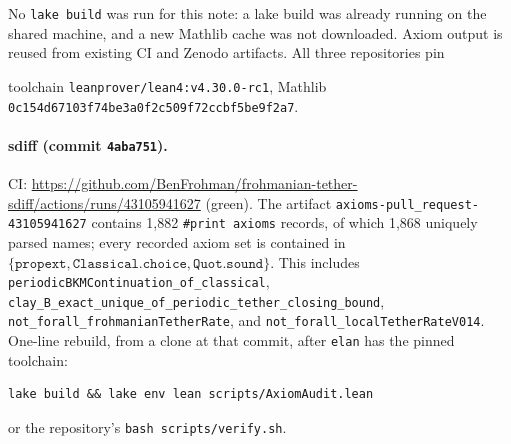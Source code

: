 \documentclass[11pt]{article}
\theoremstyle{plain}
\theoremstyle{definition}
\theoremstyle{remark}
\begin{document}
No \texttt{lake build} was run for this note: a lake build was already running on the shared machine, and a new Mathlib cache was not downloaded. Axiom output is reused from existing CI and Zenodo artifacts. All three repositories pin
\begin{center}
toolchain \texttt{leanprover/\hspace{0pt}lean4:v4.\hspace{0pt}30.\hspace{0pt}0-rc1}, \qquad
Mathlib \texttt{0c154d67103f74be3a0f2c509f72ccbf5be9f2a7}.
\end{center}

\paragraph{sdiff (commit \texttt{4aba751}).}
CI: \url{https://github.com/BenFrohman/frohmanian-tether-sdiff/actions/runs/43105941627} (green). The artifact \texttt{axioms-pull\_request-43105941627} contains 1{,}882 \texttt{\#print axioms} records, of which 1{,}868 uniquely parsed names; every recorded axiom set is contained in \(\{\texttt{propext},\texttt{Classical.choice},\texttt{Quot.sound}\}\). This includes \texttt{periodicBKMContinuation\_\hspace{0pt}of\_\hspace{0pt}classical}, \texttt{clay\_\hspace{0pt}B\_\hspace{0pt}exact\_\hspace{0pt}unique\_\hspace{0pt}of\_\hspace{0pt}periodic\_\hspace{0pt}tether\_\hspace{0pt}closing\_\hspace{0pt}bound}, \texttt{not\_\hspace{0pt}forall\_\hspace{0pt}frohmanianTetherRate}, and \texttt{not\_\hspace{0pt}forall\_\hspace{0pt}localTetherRateV014}. One-line rebuild, from a clone at that commit, after \texttt{elan} has the pinned toolchain:
\begin{lstlisting}
lake build && lake env lean scripts/AxiomAudit.lean
\end{lstlisting}
or the repository's \texttt{bash scripts/\hspace{0pt}verify.\hspace{0pt}sh}.
\end{document}
